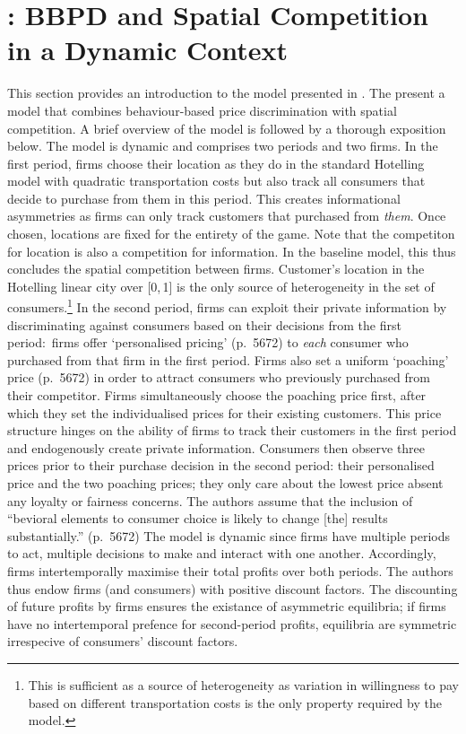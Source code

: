 \documentclass[a4paper, 11 pt, fleqn]{article}
\begin{document}
\section{\citet{Choe.2018}: BBPD and Spatial Competition in a Dynamic Context} \label{sec:choe-2018-intro}
%
This section provides an introduction to the model presented in \citet{Choe.2018}. The present a model that combines
behaviour-based price discrimination with spatial competition. A brief overview of the model is followed by a thorough
exposition below. The model is dynamic and comprises two periods and two firms.
In the first period, firms choose their location as they do in the standard Hotelling model with quadratic transportation costs
but also track all consumers that decide to purchase from them in this period. This creates informational asymmetries as
firms can only track customers that purchased from \textit{them}. Once chosen, locations are fixed for the entirety of the
game. Note that the competiton for location is also a competition for information. In the baseline model, this thus concludes the
spatial competition between firms. Customer's location in the Hotelling linear city over [0,\,1] is the only source of heterogeneity
in the set of consumers.\footnote{This is sufficient as a source of heterogeneity as variation in willingness to pay based on different
transportation costs is the only property required by the model.} In the second period, firms can exploit their private information by
discriminating against consumers based on their decisions from the first period:~firms offer `personalised pricing' (p.~5672) to
\textit{each} consumer who purchased from that firm in the first period. Firms also set a uniform `poaching' price (p.~5672) in
order to attract consumers who previously purchased from their competitor. Firms simultaneously choose the poaching price first,
after which they set the individualised prices for their existing customers. This price structure hinges on the ability of firms
to track their customers in the first period and endogenously create private information. Consumers then observe three prices
prior to their purchase decision in the second period: their personalised price and the two poaching prices; they only care about
the lowest price absent any loyalty or fairness concerns. The authors assume that the inclusion of ``bevioral elements to consumer
choice is likely to change [the] results substantially.'' (p.~5672) The model is dynamic since firms have multiple periods to act,
multiple decisions to make and interact with one another. Accordingly, firms intertemporally maximise their total profits over both
periods. The authors thus endow firms (and consumers) with positive discount factors. The discounting of future profits by firms
ensures the existance of asymmetric equilibria; if firms have no intertemporal prefence for second-period profits, equilibria are
symmetric irrespecive of consumers' discount factors.
%
\end{document}

